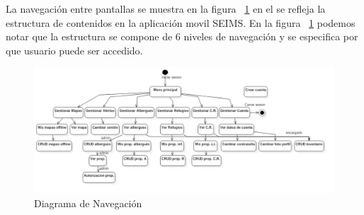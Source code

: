 La navegación entre pantallas se muestra en la figura ~\ref{fig:NavDiagram} en el se refleja la estructura de contenidos en la aplicación movil SEIMS. 
En la figura ~\ref{fig:NavDiagram} podemos notar que la estructura se compone de 6 niveles de navegación y se especifica por que usuario puede ser accedido.

\begin{figure}[htbp]
	\begin{center}
		\includegraphics[width=1.2\textwidth]{images/NavDiagram}
		\caption{Diagrama de Navegación}
		\label{fig:NavDiagram}
	\end{center}
\end{figure}
